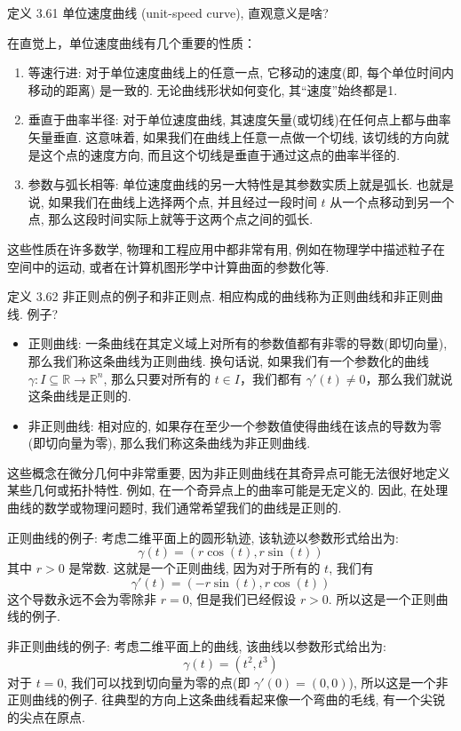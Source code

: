 \documentclass[a4paper]{ctexart}
\begin{document}
定义 3.61 单位速度曲线 (unit-speed curve), 直观意义是啥? 

在直觉上，单位速度曲线有几个重要的性质：

\begin{enumerate}
  \item 等速行进: 对于单位速度曲线上的任意一点, 它移动的速度(即, 每个单位时间内移动的距离) 是一致的. 无论曲线形状如何变化, 其“速度”始终都是1.
  \item 垂直于曲率半径: 对于单位速度曲线, 其速度矢量(或切线)在任何点上都与曲率矢量垂直. 这意味着, 
  如果我们在曲线上任意一点做一个切线, 该切线的方向就是这个点的速度方向, 而且这个切线是垂直于通过这点的曲率半径的.
  \item 参数与弧长相等: 单位速度曲线的另一大特性是其参数实质上就是弧长. 也就是说, 如果我们在曲线上选择两个点, 
  并且经过一段时间 $t$ 从一个点移动到另一个点, 那么这段时间实际上就等于这两个点之间的弧长.
\end{enumerate}

这些性质在许多数学, 物理和工程应用中都非常有用, 例如在物理学中描述粒子在空间中的运动, 或者在计算机图形学中计算曲面的参数化等. 

定义 3.62 非正则点的例子和非正则点. 相应构成的曲线称为正则曲线和非正则曲线. 例子?

\begin{itemize}
  \item 正则曲线: 一条曲线在其定义域上对所有的参数值都有非零的导数(即切向量), 那么我们称这条曲线为正则曲线. 
  换句话说, 如果我们有一个参数化的曲线 $\gamma: I \subseteq \mathbb{R} \rightarrow \mathbb{R}^n$, 
  那么只要对所有的 $t \in I$，我们都有 $\gamma'(t) \neq 0$，那么我们就说这条曲线是正则的.
  \item 非正则曲线: 相对应的, 如果存在至少一个参数值使得曲线在该点的导数为零(即切向量为零), 那么我们称这条曲线为非正则曲线.
\end{itemize}

这些概念在微分几何中非常重要, 因为非正则曲线在其奇异点可能无法很好地定义某些几何或拓扑特性. 
例如, 在一个奇异点上的曲率可能是无定义的. 因此, 在处理曲线的数学或物理问题时, 我们通常希望我们的曲线是正则的. 

正则曲线的例子: 考虑二维平面上的圆形轨迹, 该轨迹以参数形式给出为: 
$$
\gamma(t) = (r\cos(t), r\sin(t))
$$
其中 $r > 0$ 是常数. 这就是一个正则曲线, 因为对于所有的 $t$, 我们有
$$
\gamma'(t) = (-r\sin(t), r\cos(t))
$$
这个导数永远不会为零除非 $r = 0$, 但是我们已经假设 $r > 0$. 所以这是一个正则曲线的例子. 

非正则曲线的例子: 考虑二维平面上的曲线, 该曲线以参数形式给出为:
$$\gamma(t) = (t^2, t^3)$$ 对于 $t=0$, 我们可以找到切向量为零的点(即 $\gamma'(0) = (0,0)$), 
所以这是一个非正则曲线的例子. 往典型的方向上这条曲线看起来像一个弯曲的毛线, 有一个尖锐的尖点在原点. 
\end{document}
